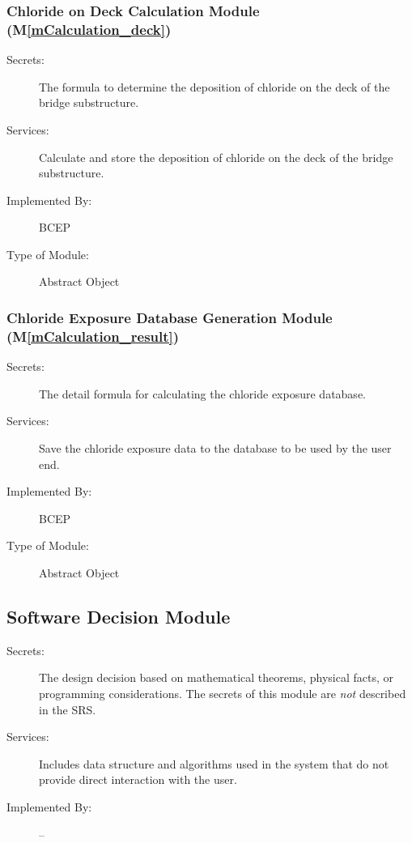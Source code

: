 \documentclass[12pt, titlepage]{article}
\newcommand{\mref}[1]{M\ref{#1}}
\begin{document}
\subsubsection{Chloride on Deck Calculation Module (\mref{mCalculation_deck})}
\begin{description}
\item[Secrets:] The formula to determine the deposition of chloride on the deck of the bridge substructure.
\item[Services:] Calculate and store the deposition of chloride on the deck of the bridge substructure.
\item[Implemented By:] BCEP
\item[Type of Module:] Abstract Object
\end{description}


\subsubsection{Chloride Exposure Database Generation Module (\mref{mCalculation_result})}
\begin{description}
\item[Secrets:] The detail formula for calculating the chloride exposure database.
\item[Services:] Save the chloride exposure data to the database to be used by the user end.
\item[Implemented By:] BCEP
\item[Type of Module:] Abstract Object
\end{description}


\subsection{Software Decision Module}

\begin{description}
\item[Secrets:] The design decision based on mathematical theorems, physical
  facts, or programming considerations. The secrets of this module are
  \emph{not} described in the SRS.
\item[Services:] Includes data structure and algorithms used in the system that
  do not provide direct interaction with the user. 
\item[Implemented By:] --
\end{description}
\end{document}
